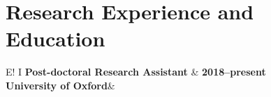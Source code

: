 \documentclass[11pt,a4paper]{article}
\newcommand\VRule{\color{lightgray}\vrule width 0.5pt}
\begin{document}

\section*{Research Experience and Education}
\noindent

\noindent\begin{tabular}{E!{\VRule} I }
{\bf Post-doctoral Research Assistant}   & {\bf 2018--present}\\
{\bf University of Oxford}&\\
\end{tabular}
\end{document}
